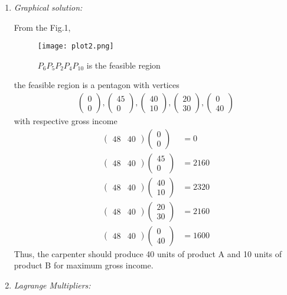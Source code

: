 \documentclass[journal,12pt,twocolumn]{IEEEtran}
\newcommand{\myvec}[1]{\ensuremath{\begin{pmatrix}#1\end{pmatrix}}}
\begin{document}
\begin{enumerate}
    \item {\em Graphical solution:}
    
        From the Fig.1,
        \begin{figure}[ht]
	        \centering
	        \texttt{[image: plot2.png]}
	        \caption{$P_6P_5P_2P_4P_{10}$ is the feasible region}
	        \label{fig}
        \end{figure}
        the feasible region is a pentagon with vertices
        \begin{align}
            \myvec{0 \\ 0},
            \myvec{45 \\ 0},
            \myvec{40 \\ 10},
            \myvec{20 \\ 30},
            \myvec{0 \\ 40}
        \end{align}
        with respective gross income
        \begin{align}
        	\myvec{48 & 40}\myvec{0 \\ 0} &= 0 \\
        	\myvec{48 & 40}\myvec{45 \\ 0} &= 2160 \\
        	\myvec{48 & 40}\myvec{40 \\ 10} &= 2320 \\
        	\myvec{48 & 40}\myvec{20 \\ 30} &= 2160 \\
        	\myvec{48 & 40}\myvec{0 \\ 40} &= 1600 
        \end{align}
        Thus, the carpenter should produce 40 units of product A and 10 units of product B for maximum gross income.
    \item {\em Lagrange Multipliers: }
    

\end{enumerate}
\end{document}

